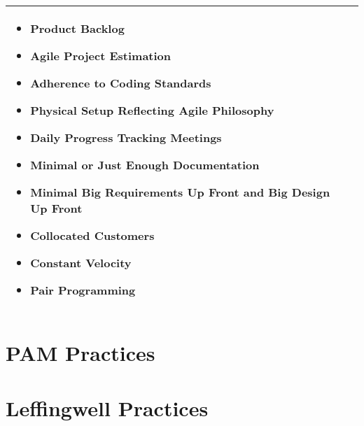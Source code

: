 \begin{tabular}{| p{7.5cm}  p{7cm} |}
\begin{itemize}
     		\item Product Backlog 
     		\item Agile Project Estimation 
     		\item Adherence to Coding Standards 
     		\item Physical Setup Reflecting Agile Philosophy 
     		\item Daily Progress Tracking Meetings 
     		\item Minimal or Just Enough Documentation 
     		\item Minimal Big Requirements Up Front and Big Design Up Front 
     		\item Collocated Customers 
     		\item Constant Velocity 
     		\item Pair Programming  
 		\end{itemize} 
     \\ \hline
\end{tabular}
\label{table:opp_practices}

\section{PAM Practices}
\section{Leffingwell Practices}


